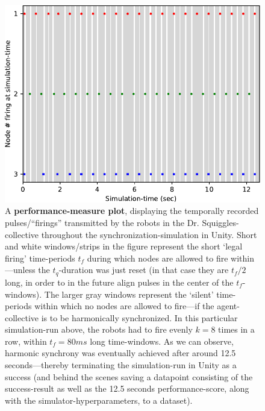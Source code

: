 		\begin{figure}
			\centering
			\includegraphics[width=\linewidth]{Assets/Figures/Illustrations/IllustrativePerfMeasurePlot.pdf}
			\caption[A \textbf{performance-measure plot}.]{A \textbf{performance-measure plot}, displaying the temporally recorded pulses/``firings'' transmitted by the robots in the Dr. Squiggles-collective throughout the synchronization-simulation in Unity. Short and white windows/strips in the figure represent the short `legal firing' time-periods $t_f$ during which nodes are allowed to fire within—unless the $t_q$-duration was just reset (in that case they are $t_f/2$ long, in order to in the future align pulses in the center of the $t_f$-windows). The larger gray windows represent the `silent' time-periods within which no nodes are allowed to fire—if the agent-collective is to be harmonically synchronized. In this particular simulation-run above, the robots had to fire evenly $k=8$ times in a row, within $t_f=80ms$ long time-windows. As we can observe, harmonic synchrony was eventually achieved after around 12.5 seconds—thereby terminating the simulation-run in Unity as a success (and behind the scenes saving a datapoint consisting of the success-result as well as the 12.5 seconds performance-score, along with the simulator-hyperparameters, to a dataset).}
			\label{fig:perf_measure_plot}
		\end{figure}

